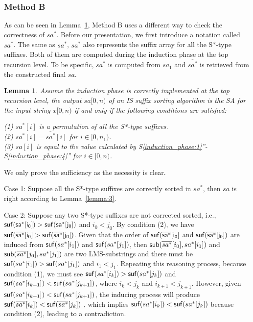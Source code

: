 \documentclass[10pt,journal,compsoc]{IEEEtran}
\newtheorem{lemma}[theorem]{Lemma}
\begin{document}
\subsubsection{Method B}\label{sec:proposals:method_b}

As can be seen in Lemma~\ref{lemma:4}, Method B uses a different way to check the correctness of $sa^*$. Before our presentation, we first introduce a notation called $\overline{sa^*}$. The same as $sa^*$, $\overline{sa^*}$ also represents the suffix array for all the S*-type suffixes. Both of them are computed during the induction phase at the top recursion level. To be specific, $sa^*$ is computed from $sa_1$ and $\overline{sa^*}$ is retrieved from the constructed final $sa$.

\begin{lemma} \label{lemma:4}
    Assume the induction phase is correctly implemented at the top recursion level, the output $sa[0, n)$ of an IS suffix sorting algorithm is the SA for the input string $x[0, n)$ if and only if the following conditions are satisfied:

	(1) $sa^*[i]$ is a permutation of all the S*-type suffixes. \\
	(2) $sa^*[i] = \overline{sa^*}[i]$ for $i \in [0, n_1)$. \\
	(3) $sa[i]$ is equal to the value calculated by S\ref{induction_phase:1}''-S\ref{induction_phase:4}'' for $i \in [0, n)$. \\

\end{lemma}

\begin{IEEEproof}

    We only prove the sufficiency as the necessity is clear.

    Case 1: Suppose all the S*-type suffixes are correctly sorted in $sa^*$, then $sa$ is right according to Lemma~\ref{lemma:3}.

    Case 2: Suppose any two S*-type suffixes are not corrected sorted, i.e., $\sf suf(sa^*[i_0]) > \sf suf(sa^*[j_0])$ and $i_0 < j_0$. By condition (2), we have $\sf suf(\overline{sa^*}[i_0] > \sf suf(\overline{sa^*}[j_0])$. Given that the order of $\sf suf(\overline{sa^*}[i_0]$ and $\sf suf(\overline{sa^*}[j_0])$ are induced from ${\sf suf}(sa^*[i_1])$ and ${\sf suf}(sa^*[j_1])$, then ${\sf sub}(\overline{sa^*}[i_0], sa^*[i_1])$ and ${\sf sub}(\overline{sa^*}[j_0], sa^*[j_1])$ are two LMS-substrings and there must be ${\sf suf}(sa^*[i_1])>{\sf suf}(sa^*[j_1])$ and $i_1 < j_1$. Repeating this reasoning process, because condition (1), we must see ${\sf suf}(sa^*[i_k])>{\sf suf}(sa^*[j_k])$ and ${\sf suf}(sa^*[i_{k+1}])<{\sf suf}(sa^*[j_{k+1}])$, where $i_k < j_k$ and $i_{k+1} < j_{k+1}$. However, given ${\sf suf}(sa^*[i_{k+1}])<{\sf suf}(sa^*[j_{k+1}])$, the inducing process will produce ${\sf suf}(\overline{sa^*}[i_k])<{\sf suf}(\overline{sa^*}[j_k])$ , which implies ${\sf suf}(sa^*[i_k])<{\sf suf}(sa^*[j_k])$ because condition (2), leading to a contradiction.
	
\end{IEEEproof}
	
\end{document}
